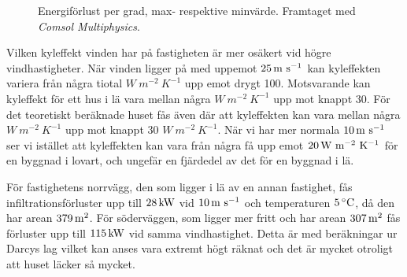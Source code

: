 \begin{figure}[hpbt]
\centering
{}
\vspace{5mm}

\caption{\label{fig:windenergyloss}Energiförlust per grad, max- respektive minvärde.
Framtaget med \emph{Comsol Multiphysics}.}
\end{figure}

Vilken kyleffekt vinden har på fastigheten är mer osäkert vid högre vindhastigheter. När vinden
 ligger på med uppemot $\unit[25]{m~s^{-1}}$ kan kyleffekten variera från några tiotal $\unit{W~m^{-2}~K^{-1}}$ upp 
 emot drygt 100. Motsvarande kan kyleffekt för ett hus i lä vara mellan några $\unit{W~m^{-2}~K^{-1}}$ upp mot knappt 30. För det teoretiskt beräknade huset fås även där att kyleffekten 
 kan vara mellan några $\unit{W~m^{-2}~K^{-1}}$ upp mot knappt 30 $\unit{W~m^{-2}~K^{-1}}$. När vi har mer normala $\unit[10]{m~s^{-1}}$ ser vi istället att kyleffekten kan vara från några få upp emot $\unit[20]{W~m^{-2}~K^{-1}}$ för en byggnad i 
 lovart, och ungefär en fjärdedel av det för en byggnad i lä.
 
För fastighetens norrvägg, den som ligger i lä av en annan fastighet, fås infiltrationsförluster upp till $\unit[28]{kW}$ vid $\unit[10]{m~s^{-1}}$ och temperaturen $\unit[5]{^\circ C}$, då den har arean $\unit[379]{m^2}$. För söderväggen, som ligger mer fritt och har arean $\unit[307]{m^2}$ fås förluster upp till $\unit[115]{kW}$ vid samma vindhastighet. Detta är med beräkningar ur Darcys lag vilket kan anses vara extremt högt räknat och det är mycket otroligt att huset läcker så mycket.


